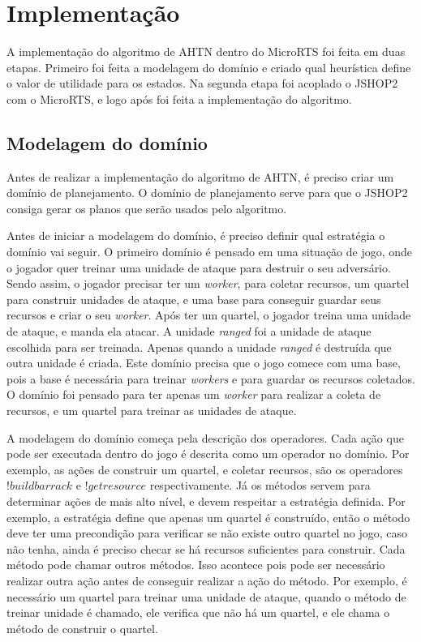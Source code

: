 
\chapter{\label{chap:impl}Implementação}

A implementação do algoritmo de AHTN dentro do MicroRTS foi feita em duas etapas.
Primeiro foi feita a modelagem do domínio e criado qual heurística define o valor de utilidade para os estados.
Na segunda etapa foi acoplado o JSHOP2 com o MicroRTS, e logo após foi feita a implementação do algoritmo.


\section{Modelagem do domínio}

Antes de realizar a implementação do algoritmo de AHTN, é preciso criar um domínio de planejamento. 
O domínio de planejamento serve para que o JSHOP2 consiga gerar os planos que serão usados pelo algoritmo.

Antes de iniciar a modelagem do domínio, é preciso definir qual estratégia o domínio vai seguir.
O primeiro domínio é pensado em uma situação de jogo, onde o jogador quer treinar uma unidade de ataque para destruir o seu adversário.
Sendo assim, o jogador precisar ter um \textit{worker}, para coletar recursos, um quartel para construir unidades de ataque, e uma base para conseguir guardar seus recursos e criar o seu \textit{worker}. 
Após ter um quartel, o jogador treina uma unidade de ataque, e manda ela atacar.
A unidade \textit{ranged} foi a unidade de ataque escolhida para ser treinada.
Apenas quando a unidade \textit{ranged} é destruída que outra unidade é criada.
Este domínio precisa que o jogo comece com uma base, pois a base é necessária para treinar \textit{workers} e para guardar os recursos coletados.  
O domínio foi pensado para ter apenas um \textit{worker} para realizar a coleta de recursos, e um quartel para treinar as unidades de ataque.

A modelagem do domínio começa pela descrição dos operadores.
Cada ação que pode ser executada dentro do jogo é descrita como um operador no domínio.
Por exemplo, as ações de construir um quartel, e coletar recursos, são os operadores $!buildbarrack$ e $!getresource$ respectivamente.
Já os métodos servem para determinar ações de mais alto nível, e devem respeitar a estratégia definida.
Por exemplo, a estratégia define que apenas um quartel é construído, então o método deve ter uma precondição para verificar se não existe outro quartel no jogo, caso não tenha, ainda é preciso checar se há recursos suficientes para construir. 
Cada método pode chamar outros métodos.
Isso acontece pois pode ser necessário realizar outra ação antes de conseguir realizar a ação do método.
Por exemplo, é necessário um quartel para treinar uma unidade de ataque, quando o método de treinar unidade é chamado, ele verifica que não há um quartel, e ele chama o método de construir o quartel.

